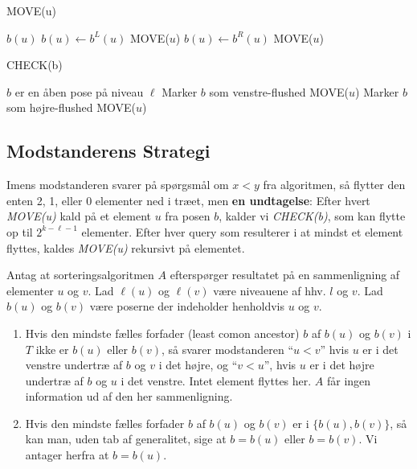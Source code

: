 \begin{algorithm}
\caption{\label{alg:move} MOVE(u)}
\begin{algorithmic}[1]
\STATE $b(u)$ 
    \RETURN
{}
    \STATE $b(u) \gets b^L(u)$
    \STATE MOVE($u$)
    \RETURN
{}
    \STATE $b(u) \gets b^R(u)$
    \STATE MOVE($u$)
    \RETURN
\ENDIF
\end{algorithmic}
\end{algorithm}

\begin{algorithm}
\caption{\label{alg:check} CHECK(b)}
\begin{algorithmic}[1]
\STATE $b$ er en åben pose på niveau $\ell$
    \STATE Marker $b$ som venstre-flushed 
    \STATE MOVE($u$)
    \RETURN
\ENDIF
{}
    \STATE Marker $b$ som højre-flushed 
    \STATE MOVE($u$)
    \RETURN
\ENDIF
\RETURN
\end{algorithmic}
\end{algorithm}

\subsection{Modstanderens Strategi}%
\label{subsec:label}

Imens modstanderen svarer på spørgsmål om $x < y$ fra algoritmen, så flytter den enten 2, 1, eller 0 elementer ned i træet, men \textbf{en undtagelse}: Efter hvert \textit{MOVE(u)} kald på et element $u$ fra posen $b$, kalder vi \textit{CHECK(b)}, som kan flytte op til $2^{k-\ell -1}$ elementer. Efter hver query som resulterer i at mindst et element flyttes, kaldes \textit{MOVE(u)} rekursivt på elementet.

Antag at sorteringsalgoritmen $A$ efterspørger resultatet på en sammenligning af elementer $u$ og $v$. Lad \(\ell(u)\) og \(\ell(v)\) være niveauene af hhv. $l$ og $v$. Lad $b(u)$ og $b(v)$ være poserne der indeholder henholdvis $u$ og $v$.

\begin{enumerate}
  \item Hvis den mindste fælles forfader (least comon ancestor) $b$ af $b(u)$ og $b(v)$ i $T$ ikke er $b(u)$ eller $b(v)$, så svarer modstanderen ``$u < v$'' hvis $u$ er i det venstre undertræ af $b$ og $v$ i det højre, og ``$v < u$'', hvis $u$ er i det højre undertræ af $b$ og $u$ i det venstre. Intet element flyttes her. $A$ får ingen information ud af den her sammenligning.
  \item Hvis den mindste fælles forfader $b$ af $b(u)$ og $b(v)$ er i $\{b(u), b(v)\}$, så kan man, uden tab af generalitet, sige at $b = b(u)$ eller $b = b(v)$. Vi antager herfra at $b = b(u)$.
\end{enumerate}





